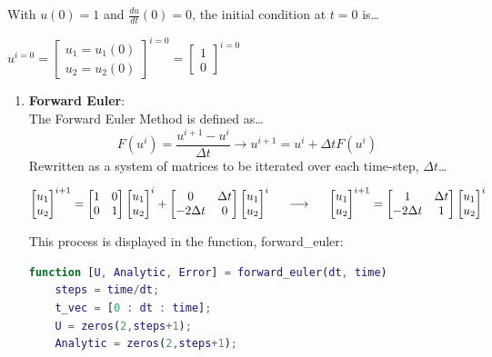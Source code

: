 \documentclass[12pt,letterpaper]{article}
\begin{document}
With $u(0) = 1$ and $\frac{du}{dt}(0) = 0$, the initial condition at $t=0$ is\ldots

\begin{center} 
    $u^{i=0} = \begin{bmatrix} u_{1}=u_{1}(0) \\ u_{2}=u_{2}(0) \end{bmatrix}^{i=0} = \begin{bmatrix} 1 \\ 0 \end{bmatrix}^{i=0}$
\end{center}

\newpage

\begin{enumerate}
	\item \textbf{Forward Euler}:\\
The Forward Euler Method is defined as\ldots
\begin{equation}
    F(u^{i}) = \frac{u^{i+1}-u^{i}}{\Delta t} \longrightarrow u^{i+1} = u^{i} + \Delta t  F(u^{i})
\end{equation}
Rewritten as a system of matrices to be itterated over each time-step, $\Delta t$\ldots
\begin{center} 
    $\begin{bmatrix} u_{1} \\ u_{2} \end{bmatrix}^{i+1} = \begin{bmatrix} 1&0 \\ 0&1 \end{bmatrix}\begin{bmatrix} u_{1} \\ u_{2} \end{bmatrix}^{i} + \begin{bmatrix} 0&\Delta t \\ -2\Delta t &0 \end{bmatrix}\begin{bmatrix} u_{1} \\ u_{2} \end{bmatrix}^{i} \hspace{0.5 cm} \longrightarrow \hspace{0.5 cm} \begin{bmatrix} u_{1} \\ u_{2} \end{bmatrix}^{i+1} = \begin{bmatrix} 1&\Delta t \\ -2\Delta t &1 \end{bmatrix} \begin{bmatrix} u_{1} \\ u_{2} \end{bmatrix}^{i}$
\end{center}
This process is displayed in the function, forward\_euler:
\begin{lstlisting}[language = Matlab]
function [U, Analytic, Error] = forward_euler(dt, time)
    steps = time/dt;
    t_vec = [0 : dt : time]; 
    U = zeros(2,steps+1);
    Analytic = zeros(2,steps+1);
    

\end{lstlisting}
\end{enumerate}
\end{document}

